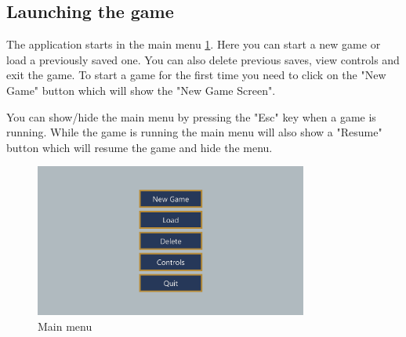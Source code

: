 \subsection{Launching the game}
The application starts in the main menu \ref{fig:main_menu}. 
Here you can start a new game or load a previously saved one.
You can also delete previous saves, view controls and exit the game.
To start a game for the first time you need to click on the "New Game" button which will show the "New Game Screen".

You can show/hide the main menu by pressing the "Esc" key when a game is running.
While the game is running the main menu will also show a "Resume" button which will resume the game and hide the menu.

\begin{figure}[H]
    \centering
    \includegraphics[width=0.8\textwidth]{sections/user_manual/resources/main-menu.png}
    \caption{Main menu}
    \label{fig:main_menu}
\end{figure}